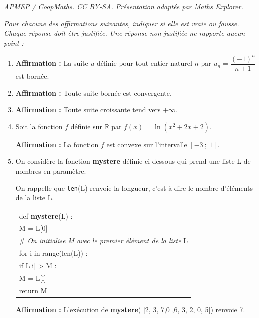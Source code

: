 \documentclass[10pt]{article}
\providecommand{\R}{\mathbb{R}}
\begin{document}
\noindent\textit{APMEP / CoopMaths. CC BY-SA. Présentation adaptée par Maths Explorer.}\par\medskip
\medskip

\emph{Pour  chacune des affirmations suivantes, indiquer si elle est vraie ou fausse. Chaque
réponse doit être justifiée. Une réponse non justifiée ne rapporte aucun point :}

\medskip

\begin{enumerate}
\item \textbf{Affirmation :} La suite $u$ définie pour tout entier naturel $n$ par $u_n = \dfrac{(- 1)^n}{n + 1}$ est bornée.
\item \textbf{Affirmation :} Toute suite bornée est convergente.
\item \textbf{Affirmation :} Toute suite croissante tend vers $+\infty$.
\item Soit la fonction $f$ définie sur $\R$ par $f(x) = \ln \left(x^2 + 2x + 2\right)$.

\textbf{Affirmation :} La fonction $f$ est convexe sur l'intervalle $[-3~;~1]$.
\item On considère la fonction {\ttfamily \textbf{mystere}} définie ci-dessous qui prend une liste L de nombres en paramètre. 

On rappelle que \texttt{len}(L) renvoie la longueur, c'est-à-dire
le nombre d'éléments de la liste L.

\begin{center}
\begin{tabular}{|>{\ttfamily}l|}\hline
 def \textbf{mystere}(L) :\\
\qquad M = L[0]\\
\qquad \# \emph{On initialise M avec le premier élément de la liste }L\\
\qquad for i in range(len(L)) : \\
\qquad \quad if L[i] > M :\\
\qquad \qquad M = L[i]\\
\qquad return M \\ \hline
\end{tabular}
\end{center}

\textbf{Affirmation :} L'exécution de {\ttfamily \textbf{mystere}( [2, 3, 7,0 ,6, 3, 2, 0, 5])} renvoie 7.
\end{enumerate}
\end{document}
